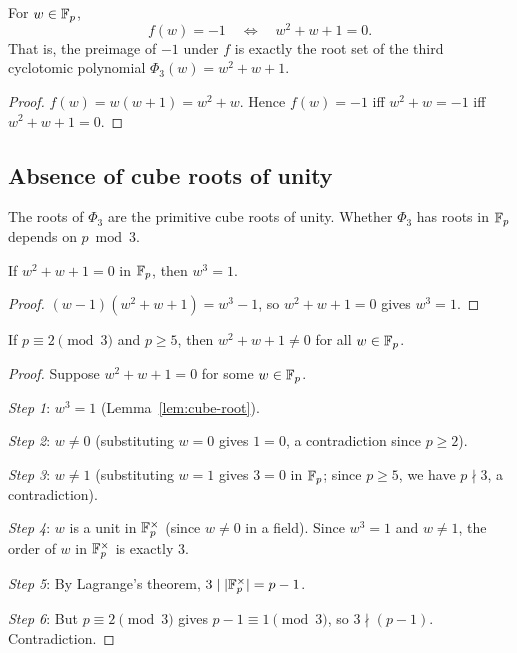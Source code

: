 \begin{lemma}\label{lem:phi3-criterion}
For $w \in \mathbb{F}_p$,
\[
  f(w) = -1 \quad \Longleftrightarrow \quad w^2 + w + 1 = 0.
\]
That is, the preimage of $-1$ under $f$ is exactly the root set of the
third cyclotomic polynomial $\Phi_3(w) = w^2 + w + 1$.
\end{lemma}

\begin{proof}
$f(w) = w(w+1) = w^2 + w$. Hence $f(w) = -1$ iff $w^2 + w = -1$ iff
$w^2 + w + 1 = 0$.
\end{proof}

\subsection{Absence of cube roots of unity}

The roots of $\Phi_3$ are the primitive cube roots of unity. Whether
$\Phi_3$ has roots in $\mathbb{F}_p$ depends on $p \bmod 3$.

\begin{lemma}\label{lem:cube-root}
If $w^2 + w + 1 = 0$ in $\mathbb{F}_p$, then $w^3 = 1$.
\end{lemma}

\begin{proof}
$(w-1)(w^2+w+1) = w^3 - 1$, so $w^2 + w + 1 = 0$ gives $w^3 = 1$.
\end{proof}

\begin{theorem}\label{thm:phi3-no-roots}
If $p \equiv 2 \pmod{3}$ and $p \geq 5$, then $w^2 + w + 1 \neq 0$ for
all $w \in \mathbb{F}_p$.
\end{theorem}

\begin{proof}
Suppose $w^2 + w + 1 = 0$ for some $w \in \mathbb{F}_p$.

\emph{Step 1}: $w^3 = 1$ (Lemma~\ref{lem:cube-root}).

\emph{Step 2}: $w \neq 0$ (substituting $w = 0$ gives $1 = 0$, a
contradiction since $p \geq 2$).

\emph{Step 3}: $w \neq 1$ (substituting $w = 1$ gives $3 = 0$ in $\mathbb{F}_p$;
since $p \geq 5$, we have $p \nmid 3$, a contradiction).

\emph{Step 4}: $w$ is a unit in $\mathbb{F}_p^\times$ (since $w \neq 0$ in a field).
Since $w^3 = 1$ and $w \neq 1$, the order of $w$ in $\mathbb{F}_p^\times$ is
exactly $3$.

\emph{Step 5}: By Lagrange's theorem, $3 \mid |\mathbb{F}_p^\times| = p - 1$.

\emph{Step 6}: But $p \equiv 2 \pmod{3}$ gives $p - 1 \equiv 1 \pmod{3}$,
so $3 \nmid (p-1)$. Contradiction.
\end{proof}

